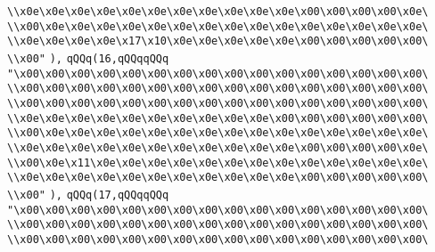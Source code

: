 \verb|\\x0e\x0e\x0e\x0e\x0e\x0e\x0e\x0e\x0e\x0e\x0e\x00\x00\x00\x00\x0e\|\newline
\verb|\\x00\x0e\x0e\x0e\x0e\x0e\x0e\x0e\x0e\x0e\x0e\x0e\x0e\x0e\x0e\x0e\|\newline
\verb|\\x0e\x0e\x0e\x0e\x17\x10\x0e\x0e\x0e\x0e\x0e\x00\x00\x00\x00\x00\|\newline
\verb|\\x00"|\newline
\verb|),|\newline
\verb|qQQq(16,qQQqqQQq|\newline
\verb|"\x00\x00\x00\x00\x00\x00\x00\x00\x00\x00\x00\x00\x00\x00\x00\x00\|\newline
\verb|\\x00\x00\x00\x00\x00\x00\x00\x00\x00\x00\x00\x00\x00\x00\x00\x00\|\newline
\verb|\\x00\x00\x00\x00\x00\x00\x00\x00\x00\x00\x00\x00\x00\x00\x00\x00\|\newline
\verb|\\x0e\x0e\x0e\x0e\x0e\x0e\x0e\x0e\x0e\x0e\x00\x00\x00\x00\x00\x00\|\newline
\verb|\\x00\x0e\x0e\x0e\x0e\x0e\x0e\x0e\x0e\x0e\x0e\x0e\x0e\x0e\x0e\x0e\|\newline
\verb|\\x0e\x0e\x0e\x0e\x0e\x0e\x0e\x0e\x0e\x0e\x0e\x00\x00\x00\x00\x0e\|\newline
\verb|\\x00\x0e\x11\x0e\x0e\x0e\x0e\x0e\x0e\x0e\x0e\x0e\x0e\x0e\x0e\x0e\|\newline
\verb|\\x0e\x0e\x0e\x0e\x0e\x0e\x0e\x0e\x0e\x0e\x0e\x00\x00\x00\x00\x00\|\newline
\verb|\\x00"|\newline
\verb|),|\newline
\verb|qQQq(17,qQQqqQQq|\newline
\verb|"\x00\x00\x00\x00\x00\x00\x00\x00\x00\x00\x00\x00\x00\x00\x00\x00\|\newline
\verb|\\x00\x00\x00\x00\x00\x00\x00\x00\x00\x00\x00\x00\x00\x00\x00\x00\|\newline
\verb|\\x00\x00\x00\x00\x00\x00\x00\x00\x00\x00\x00\x00\x00\x00\x00\x00\|\newline
